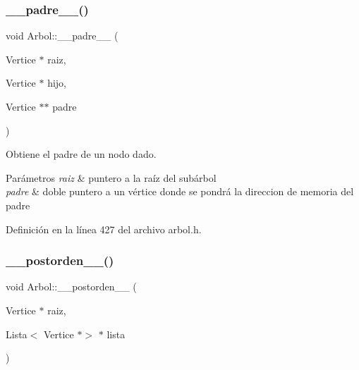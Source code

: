 \mbox{\label{classArbol_a495a7502a29e01ce7fa168daca651b1f}} 
\subsubsection{\texorpdfstring{\+\_\+\+\_\+padre\+\_\+\+\_\+()}{\_\_padre\_\_()}}
{\footnotesize\ttfamily void Arbol\+::\+\_\+\+\_\+padre\+\_\+\+\_\+ (\begin{DoxyParamCaption}\item[{Vertice $\ast$}]{raiz,  }\item[{Vertice $\ast$}]{hijo,  }\item[{Vertice $\ast$$\ast$}]{padre }\end{DoxyParamCaption})\hspace{0.3cm}{\ttfamily [protected]}}



Obtiene el padre de un nodo dado. 


\begin{DoxyParams}{Parámetros}
{\em raiz} & puntero a la raíz del subárbol \\
\hline
{\em padre} & doble puntero a un vértice donde se pondrá la direccion de memoria del padre \\
\hline
\end{DoxyParams}


Definición en la línea 427 del archivo arbol.\+h.

\mbox{\label{classArbol_aea4cc9147a79d74956413a233df1dbe0}} 
\subsubsection{\texorpdfstring{\+\_\+\+\_\+postorden\+\_\+\+\_\+()}{\_\_postorden\_\_()}}
{\footnotesize\ttfamily void Arbol\+::\+\_\+\+\_\+postorden\+\_\+\+\_\+ (\begin{DoxyParamCaption}\item[{Vertice $\ast$}]{raiz,  }\item[{Lista$<$ Vertice $\ast$$>$ $\ast$}]{lista }\end{DoxyParamCaption})\hspace{0.3cm}{\ttfamily [protected]}}



